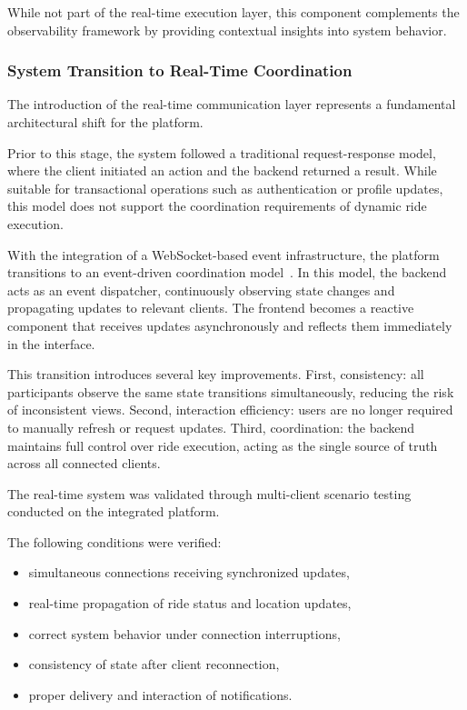 While not part of the real-time execution layer, this component complements the observability framework by providing contextual insights into system behavior.

\subsubsection{System Transition to Real-Time Coordination}

The introduction of the real-time communication layer represents a fundamental architectural shift for the platform.

Prior to this stage, the system followed a traditional request-response model, where the client initiated an action and the backend returned a result. While suitable for transactional operations such as authentication or profile updates, this model does not support the coordination requirements of dynamic ride execution.

With the integration of a WebSocket-based event infrastructure, the platform transitions to an event-driven coordination model~\cite{event_driven_architecture}. In this model, the backend acts as an event dispatcher, continuously observing state changes and propagating updates to relevant clients. The frontend becomes a reactive component that receives updates asynchronously and reflects them immediately in the interface.

This transition introduces several key improvements. First, consistency: all participants observe the same state transitions simultaneously, reducing the risk of inconsistent views. Second, interaction efficiency: users are no longer required to manually refresh or request updates. Third, coordination: the backend maintains full control over ride execution, acting as the single source of truth across all connected clients.

The real-time system was validated through multi-client scenario testing conducted on the integrated platform.

The following conditions were verified:

\begin{itemize}
    \item simultaneous connections receiving synchronized updates,
    \item real-time propagation of ride status and location updates,
    \item correct system behavior under connection interruptions,
    \item consistency of state after client reconnection,
    \item proper delivery and interaction of notifications.
\end{itemize}

